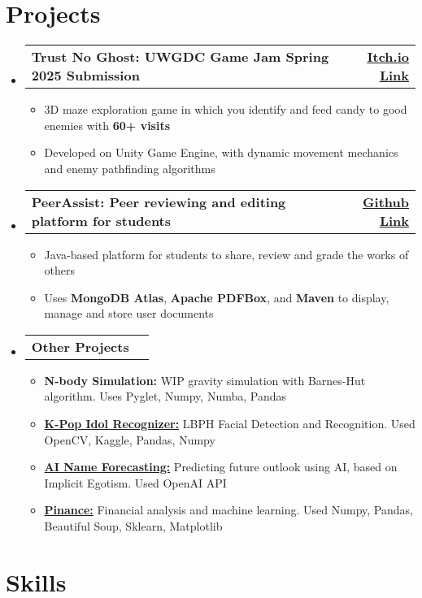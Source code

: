 \documentclass[letterpaper,11pt]{article}
\makeatletter
\newcommand{\resumeItem}[1]{
  \item\small{
    {#1 \vspace{-2pt}}
  }
}
\newcommand{\resumeProjectHeading}[2]{
    \item
    \begin{tabular*}{1.001\textwidth}{l@{\extracolsep{\fill}}r}
      \small#1 & \textbf{\small #2}\\
    \end{tabular*}\vspace{-7pt}
}
\newcommand{\resumeSubHeadingListStart}{\begin{itemize}[leftmargin=0.0in, label={}]}
\newcommand{\resumeSubHeadingListEnd}{\end{itemize}}
\newcommand{\resumeItemListStart}{\begin{itemize}}
\newcommand{\resumeItemListEnd}{\end{itemize}\vspace{-5pt}}
\makeatother
\begin{document}
\section{Projects}
\vspace{-5pt}
\resumeSubHeadingListStart
    \resumeProjectHeading{\textbf{Trust No Ghost: UWGDC Game Jam Spring 2025 Submission}}{\href{https://ianleung12.itch.io/trust-no-ghost}{\underline{Itch.io Link}}}
    \resumeItemListStart
        \resumeItem{3D maze exploration game in which you identify and feed candy to good enemies with \textbf{60+ visits}}
        \resumeItem{Developed on Unity Game Engine,  with dynamic movement mechanics and enemy pathfinding algorithms}
    \resumeItemListEnd
    \vspace{-18pt}
    \resumeProjectHeading{\textbf{PeerAssist: Peer reviewing and editing platform for students }}{\href{https://github.com/IanLeung12/PeerAssist}{\underline{Github Link}}}
    \resumeItemListStart
        \resumeItem{Java-based platform for students to share, review and grade the works of others}
        \resumeItem{Uses \textbf{MongoDB Atlas}, \textbf{Apache PDFBox}, and \textbf{Maven }to display, manage and store user documents}
    \resumeItemListEnd
    \vspace{-18pt}
    \resumeProjectHeading{\textbf{Other Projects}}{}
    \resumeItemListStart
        \resumeItem{\textbf{N-body Simulation:} WIP gravity simulation with Barnes-Hut algorithm. Uses Pyglet, Numpy, Numba, Pandas}
        \resumeItem{\href{https://github.com/IanLeung12/ai-skill-showcase}{\textbf{K-Pop Idol Recognizer:}} LBPH Facial Detection and Recognition. Used OpenCV, Kaggle, Pandas, Numpy}
        \resumeItem{\href{https://github.com/IanLeung12/AI-Name-Forecasting}{\textbf{AI Name Forecasting:}} Predicting future outlook using AI, based on Implicit Egotism. Used OpenAI API}
        \resumeItem{\href{https://github.com/IanLeung12/Pinance}{\textbf{Pinance:}} Financial analysis and machine learning. Used Numpy, Pandas, Beautiful Soup, Sklearn, Matplotlib}
    \resumeItemListEnd
    \vspace{-15pt}
    
\resumeSubHeadingListEnd
\vspace{-1pt}

\section{Skills}
\end{document}
